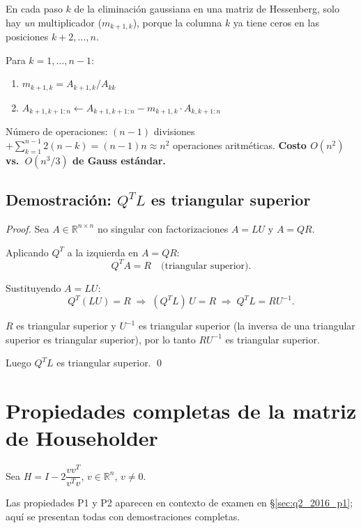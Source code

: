 \documentclass[11pt,a4paper]{article}
\begin{document}
En cada paso $k$ de la eliminación gaussiana en una matriz de Hessenberg,
solo hay \emph{un} multiplicador ($m_{k+1,k}$), porque la columna $k$
ya tiene ceros en las posiciones $k+2,\ldots,n$.

\begin{tcolorbox}[algo,
                  title={Rutina GaussH}]
Para $k = 1,\ldots,n-1$:
\begin{enumerate}[noitemsep]
  \item $m_{k+1,k} = A_{k+1,k}/A_{kk}$
  \item $A_{k+1,k+1:n} \leftarrow A_{k+1,k+1:n} - m_{k+1,k}\cdot A_{k,k+1:n}$
\end{enumerate}
Número de operaciones: $(n-1)$ divisiones $+\sum_{k=1}^{n-1}2(n-k) = (n-1)n \approx n^2$
operaciones aritméticas. \textbf{Costo $O(n^2)$ vs.\ $O(n^3/3)$ de Gauss estándar.}
\end{tcolorbox}

\subsection{Demostración: $Q^TL$ es triangular superior}
\label{sec:qtl_upper}

\begin{proof}
Sea $A \in \mathbb{R}^{n\times n}$ no singular con factorizaciones $A=LU$ y $A=QR$.

Aplicando $Q^T$ a la izquierda en $A=QR$:
\[
  Q^TA = R \quad \text{(triangular superior)}.
\]

Sustituyendo $A=LU$:
\[
  Q^T(LU) = R \;\Longrightarrow\; (Q^TL)\,U = R \;\Longrightarrow\; Q^TL = RU^{-1}.
\]

$R$ es triangular superior y $U^{-1}$ es triangular superior
(la inversa de una triangular superior es triangular superior),
por lo tanto $RU^{-1}$ es triangular superior.

Luego $Q^TL$ es triangular superior. \qed
\end{proof}

\section{Propiedades completas de la matriz de Householder}
\label{sec:householder_completo}

Sea $H = I - 2\dfrac{vv^T}{v^Tv}$, \quad $v \in \mathbb{R}^n$, $v\neq 0$.

Las propiedades P1 y P2 aparecen en contexto de examen en \S\ref{sec:q2_2016_p1};
aquí se presentan todas con demostraciones completas.
\end{document}
